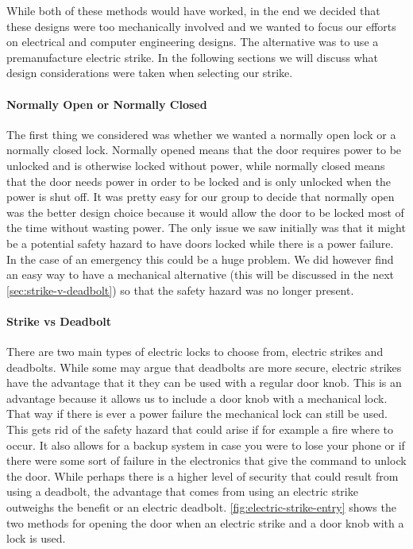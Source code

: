 While both of these methods would have worked, in the end we decided that these
designs were too mechanically involved and we wanted to focus our efforts on
electrical and computer engineering designs. The alternative was to use a
premanufacture electric strike. In the following sections we will discuss what
design considerations were taken when selecting our strike.

\paragraph{Normally Open or Normally Closed}
The first thing we considered was whether we wanted a normally open lock or a
normally closed lock. Normally opened means that the door requires power to be
unlocked and is otherwise locked without power, while normally closed means
that the door needs power in order to be locked and is only unlocked when the
power is shut off. It was pretty easy for our group to decide that normally
open was the better design choice because it would allow the door to be locked
most of the time without wasting power. The only issue we saw initially was
that it might be a potential safety hazard to have doors locked while there is
a power failure. In the case of an emergency this could be a huge problem. We
did however find an easy way to have a mechanical alternative (this will be
discussed in the next \autoref{sec:strike-v-deadbolt}) so that the safety hazard was
no longer present.

\paragraph{Strike vs Deadbolt}
\label{sec:strike-v-deadbolt}
There are two main types of electric locks to choose from, electric strikes and
deadbolts. While some may argue that deadbolts are more secure, electric
strikes have the advantage that it they can be used with a regular door knob.
This is an advantage because it allows us to include a door knob with a
mechanical lock. That way if there is ever a power failure the mechanical lock
can still be used. This gets rid of the safety hazard that could arise if for
example a fire where to occur. It also allows for a backup system in case you
were to lose your phone or if there were some sort of failure in the
electronics that give the command to unlock the door. While perhaps there is a
higher level of security that could result from using a deadbolt, the advantage
that comes from using an electric strike outweighs the benefit or an electric
deadbolt. \autoref{fig:electric-strike-entry} shows the two methods for opening the door when
an electric strike and a door knob with a lock is used.

